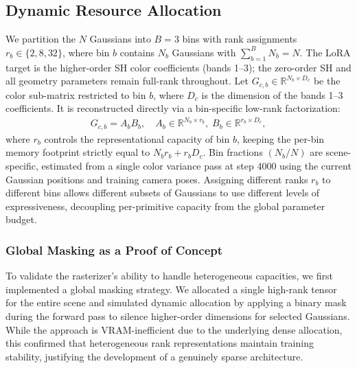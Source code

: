 \documentclass[sigconf]{acmart}
\begin{document}
\subsection{Dynamic Resource Allocation}

We partition the $N$ Gaussians into $B = 3$ bins with rank
assignments $r_b \in \{2, 8, 32\}$, where bin $b$ contains $N_b$ Gaussians
with $\sum_{b=1}^{B} N_b = N$. The LoRA target is the higher-order SH color coefficients (bands 1--3); the
zero-order SH and all geometry parameters remain full-rank throughout. Let
$G_{c,b} \in \mathbb{R}^{N_b \times D_c}$ be the color sub-matrix restricted
to bin $b$, where $D_c$ is the dimension of the bands 1--3 coefficients. It is
reconstructed directly via a bin-specific low-rank factorization:
\begin{align}
  G_{c,b} = A_b B_b, \quad A_b \in \mathbb{R}^{N_b \times r_b},\;
  B_b \in \mathbb{R}^{r_b \times D_c},
\end{align}
where $r_b$ controls the representational capacity of bin $b$, keeping the
per-bin memory footprint strictly equal to $N_b r_b + r_b D_c$. Bin fractions
$(N_b / N)$ are scene-specific, estimated from a single color variance pass at
step 4000 using the current Gaussian positions and training camera poses.
Assigning different ranks $r_b$ to different bins allows different subsets of
Gaussians to use different levels of expressiveness, decoupling per-primitive
capacity from the global parameter budget.

\subsubsection{Global Masking as a Proof of Concept}
To validate the rasterizer's ability to handle heterogeneous capacities, we 
first implemented a global masking strategy. We allocated a single high-rank 
tensor for the entire scene and simulated dynamic allocation by applying a 
binary mask during the forward pass to silence higher-order dimensions for 
selected Gaussians. While the approach is VRAM-inefficient due to the 
underlying dense allocation, this confirmed that heterogeneous rank 
representations maintain training stability, justifying the development of a 
genuinely sparse architecture.
\end{document}
